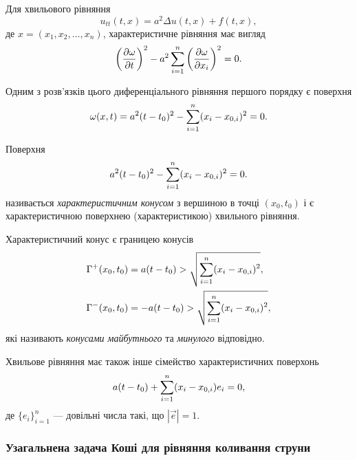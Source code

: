 Для хвильового рівняння
\begin{equation}
    u_{tt}(t, x) = a^2 \Delta u(t, x) + f(t, x),
\end{equation}
де $x = (x_1, x_2, \ldots, x_n)$, характеристичне рівняння має вигляд
\begin{equation}
    \left( \frac{\partial \omega}{\partial t} \right)^2 - a^2 \displaystyle\sum\limits_{i = 1}^n \left(\frac{\partial \omega}{\partial x_i} \right)^2 = 0.
\end{equation}

Одним з розв'язків цього диференціального рівняння першого порядку є поверхня
\begin{equation}
    \omega(x, t) = a^2 (t - t_0)^2 - \displaystyle\sum\limits_{i = 1}^n (x_i - x_{0, i})^2 = 0.
\end{equation}

\begin{definition}
    Поверхня
    \begin{equation}
        a^2 (t - t_0)^2 - \displaystyle\sum\limits_{i = 1}^n (x_i - x_{0, i})^2 = 0.
    \end{equation}
    називається \textit{характеристичним конусом} з вершиною в точці $(x_0, t_0)$ і є характеристичною поверхнею (характеристикою) хвильного рівняння.
\end{definition}

\begin{remark}
    Характеристичний конус є границею конусів
    \begin{align}
        \Gamma^+(x_0, t_0) &= a (t - t_0) > \sqrt{ \displaystyle\sum\limits_{i = 1}^n (x_i - x_{0, i})^2 }, \\
        \Gamma^-(x_0, t_0) &= - a (t - t_0) > \sqrt{ \displaystyle\sum\limits_{i = 1}^n (x_i - x_{0, i})^2 },
    \end{align}
    які називають \textit{конусами майбутнього} та \textit{минулого} відповідно.
\end{remark}

Хвильове рівняння має також інше сімейство характеристичних поверхонь
\begin{equation}
    a (t - t_0) + \displaystyle\sum\limits_{i = 1}^n (x_i - x_{0,i}) e_i = 0,
\end{equation}
де $\{e_i\}_{i = 1}^n$ --- довільні числа такі, що $|\vec e| = 1$.

\subsubsection{Узагальнена задача Коші для рівняння коливання струни}

